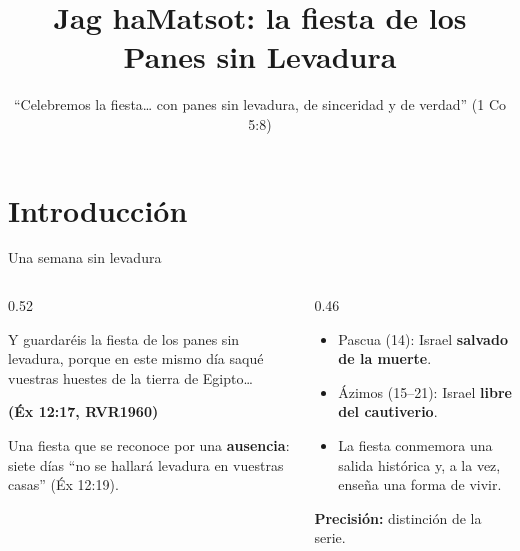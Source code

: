 \documentclass[hyperref={bookmarks=false},aspectratio=169]{beamer}
\title[Matsot]{\bfseries{Jag haMatsot: la fiesta de los Panes sin Levadura}}
\subtitle{``Celebremos la fiesta\ldots{} con panes sin levadura, de sinceridad y de verdad'' (1 Co 5:8)}
\author{}\institute{}\date{}
\newcommand{\fuente}[1]{\par\hfill{\upshape\bfseries\footnotesize\textcolor{tierraroja}{#1}}}
\newcommand{\destacar}[1]{\textbf{\textcolor{tierraroja}{#1}}}
\newcommand{\precision}[1]{{\footnotesize\color{sepia}\textbf{Precisión:} #1}}
\begin{document}
\frame{\titlepage}


\section{Introducción}

\begin{frame}{Una semana sin levadura}
\begin{columns}[c,onlytextwidth]
\begin{column}{0.52\textwidth}
\begin{cita}Y guardaréis la fiesta de los panes sin levadura, porque en este mismo día saqué vuestras huestes de la tierra de Egipto\ldots\fuente{(Éx 12:17, RVR1960)}\end{cita}
\small Una fiesta que se reconoce por una \destacar{ausencia}: siete días ``no se hallará levadura en vuestras casas'' (Éx 12:19).
\end{column}
\begin{column}{0.46\textwidth}\small
\begin{itemize}
\item Pascua (14): Israel \destacar{salvado de la muerte}.
\item Ázimos (15--21): Israel \destacar{libre del cautiverio}.
\item La fiesta conmemora una salida histórica y, a la vez, enseña una forma de vivir.
\end{itemize}
\precision{distinción de la serie.}
\end{column}
\end{columns}
\end{frame}
\end{document}
